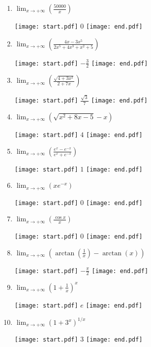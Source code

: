 \documentclass[12pt]{article}
\begin{document}
\begin{enumerate}

\item $\lim_{x \to +\infty}\left({\frac{50000}{x}}\right)$

\texttt{[image: start.pdf]}
{{$0$}}
\texttt{[image: end.pdf]}


\item $\lim_{x \to +\infty}\left({\frac{4x-3x^5}{2x^5+4x^3+x^2+5}}\right)$

\texttt{[image: start.pdf]}
{{$-\frac{3}{2}$}}
\texttt{[image: end.pdf]}


\item $\lim_{x \to +\infty}\left({\frac{\sqrt{4+3x^2}}{2+7x}}\right)$

\texttt{[image: start.pdf]}
{{$\frac{\sqrt{3}}{7}$}}
\texttt{[image: end.pdf]}


\item $\lim_{x \to +\infty}\left({\sqrt{x^2+8x-5}-x}\right)$

\texttt{[image: start.pdf]}
{{$4$}}
\texttt{[image: end.pdf]}


\item $\lim_{x \to +\infty}\left({\frac{e^x-e^{-x}}{e^x+e^{-x}}}\right)$

\texttt{[image: start.pdf]}
{{$1$}}
\texttt{[image: end.pdf]}


\item $\lim_{x \to +\infty}\left({xe^{-x}}\right)$

\texttt{[image: start.pdf]}
{{$0$}}
\texttt{[image: end.pdf]}


\item $\lim_{x \to +\infty}\left({\frac{\cos{x}}{x}}\right)$

\texttt{[image: start.pdf]}
{{$0$}}
\texttt{[image: end.pdf]}


\item $\lim_{x \to +\infty}\left({\arctan\left(\frac{1}{x}\right)-\arctan(x)}\right)$

\texttt{[image: start.pdf]}
{{$-\frac{\pi}{2}$}}
\texttt{[image: end.pdf]}


\item $\lim_{x \to +\infty}\left(1+\frac{1}{x}\right)^{x}$

\texttt{[image: start.pdf]}
{{$e$}}
\texttt{[image: end.pdf]}


\item $\lim_{x \to +\infty}\left(1+3^x\right)^{1/x}$

\texttt{[image: start.pdf]}
{{$3$}}
\texttt{[image: end.pdf]}


\end{enumerate}
\end{document}
